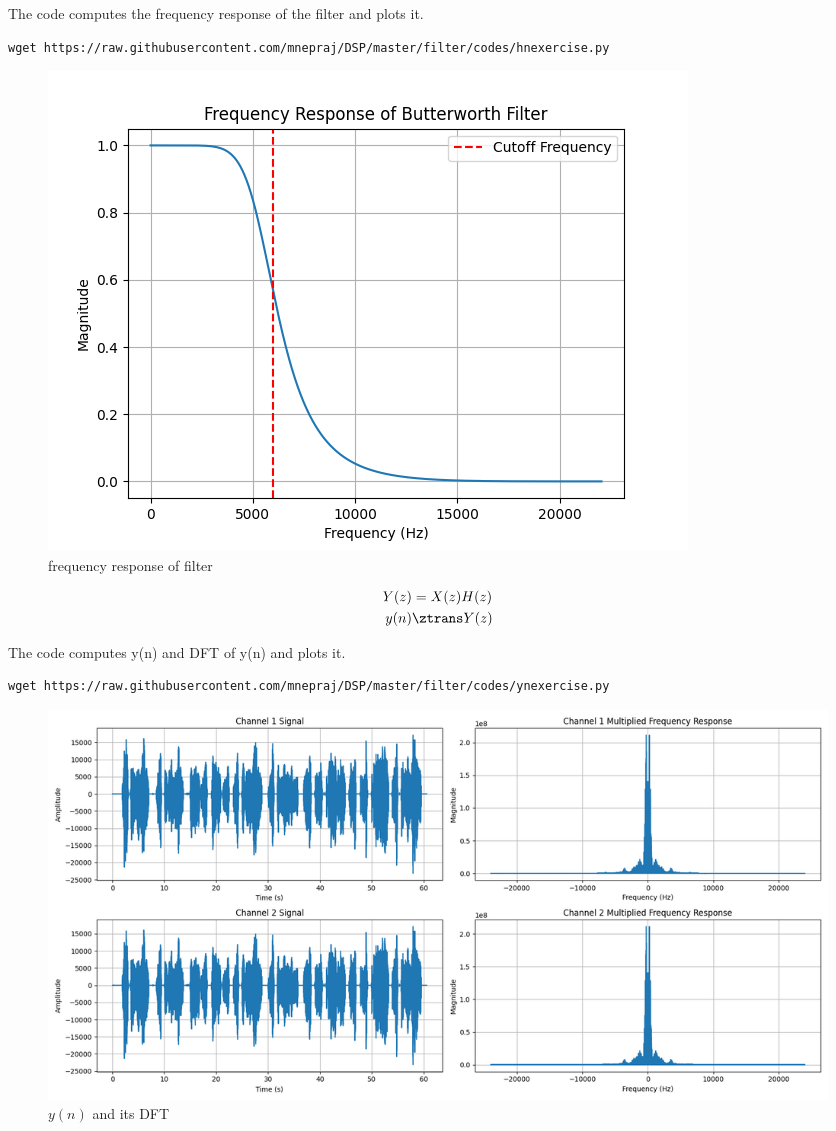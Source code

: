 \documentclass[journal, 12pt, twocolumn]{IEEEtran}
\renewcommand\thesection{\arabic{section}}
\begin{document}
\begin{enumerate}[label=\thesection.\arabic*]
	      The code computes the frequency response of the filter and plots it.
	      \begin{lstlisting}
wget https://raw.githubusercontent.com/mnepraj/DSP/master/filter/codes/hnexercise.py
\end{lstlisting}
	      \begin{figure}[h]
		      \centering
		      \includegraphics[width=\columnwidth]{figs/hnexercise.png}
		      \caption{frequency response of filter}
		      \label{fig:hn_exercise}
	      \end{figure}
	      \begin{align}
		      Y(z) & = X(z)H(z)   \\
		      y(n) & \ztrans Y(z)
	      \end{align}

	      The code computes y(n) and DFT of y(n) and plots it.
	      \begin{lstlisting}
wget https://raw.githubusercontent.com/mnepraj/DSP/master/filter/codes/ynexercise.py
\end{lstlisting}
	      \begin{figure}[h]
		      \centering
		      \includegraphics[width=\columnwidth]{figs/ynexercise.png}
		      \caption{$y(n)$ and its DFT}
		      \label{fig:yn_exercise}
	      \end{figure}




\end{enumerate}
\end{document}
